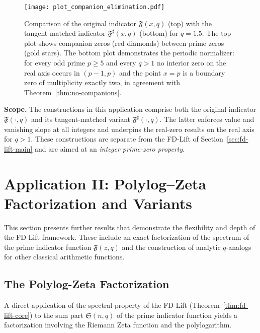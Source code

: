 \documentclass[11pt,a4paper]{amsart}
\newcommand{\Fbase}{\mathfrak F}
\newcommand{\Fsharp}{\Fbase^{\sharp}}
\theoremstyle{plain}
\theoremstyle{definition}
\theoremstyle{remark}
\begin{document}
\begin{figure}[t]
\centering
\texttt{[image: plot\_companion\_elimination.pdf]}
\caption{Comparison of the original indicator $\mathfrak{F}(x,q)$ (top) with the tangent-matched indicator $\Fsharp(x,q)$ (bottom) for $q=1.5$. The top plot shows companion zeros (red diamonds) between prime zeros (gold stars). The bottom plot demonstrates the periodic normalizer: for every odd prime $p\ge5$ and every $q>1$ no interior zero on the real axis occurs in $(p-1,p)$ and the point $x=p$ is a boundary zero of multiplicity exactly two, in agreement with Theorem~\ref{thm:no-companions}.}
\label{fig:companion_elimination}
\end{figure}

\FloatBarrier


\noindent\textbf{Scope.} The constructions in this application comprise both the original indicator $\mathfrak F(\cdot,q)$ and its tangent-matched variant $\Fsharp(\cdot,q)$. The latter enforces value and vanishing slope at all integers and underpins the real-zero results on the real axis for $q>1$. These constructions are separate from the FD-Lift of Section~\ref{sec:fd-lift-main} and are aimed at an \emph{integer prime-zero property}.

\section{Application II: Polylog–Zeta Factorization and Variants}\label{sec:application-key-results}

This section presents further results that demonstrate the flexibility and depth of the FD-Lift framework. These include an exact factorization of the spectrum of the prime indicator function $\mathfrak{F}(z,q)$ and the construction of analytic $q$-analogs for other classical arithmetic functions.

\subsection{The Polylog-Zeta Factorization}

A direct application of the spectral property of the FD-Lift (Theorem~\ref{thm:fd-lift-core}) to the sum part $\mathfrak{S}(n,q)$ of the prime indicator function yields a factorization involving the Riemann Zeta function and the polylogarithm.
\end{document}
